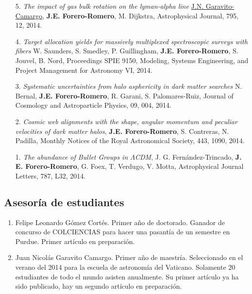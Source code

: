 \documentclass{article}
\begin{document}
\begin{enumerate}
\item[5.]{\it The impact of gas bulk rotation on the lyman-alpha line}
  \underline{J.N. Garavito-Camargo},  {\bf J.E. Forero-Romero}, M. Dijkstra,
  Astrophysical Journal, 795, 12, 2014.

\item[4.]{\it } {\it Target allocation yields for massively
  multiplexed spectroscopic surveys with fibers} W. Saunders,
  S. Smedley, P. Guillingham, {\bf J.E. Forero-Romero}, S. Jouvel,
  B. Nord, Proceedings SPIE 9150, Modeling, Systems Engineering, and
  Project Management for Astronomy VI, 2014.

\item[3.]{\it Systematic uncertainties from halo asphericity in dark
  matter searches}  N. Bernal, {\bf J.E. Forero-Romero}, R. Garani,
  S. Palomares-Ruiz, Journal of Cosmology and Astroparticle Physics,
  09, 004, 2014. 

\item[2.]{\it Cosmic web alignments with the shape, angular momentum
  and peculiar velocities of dark matter halos}, 
  {\bf J.E. Forero-Romero}, S. Contreras, N. Padilla, Monthly Notices
  of the Royal Astronomical Society, 443,
  1090, 2014. 

\item[1.]{\it The abundance of Bullet Groups in $\Lambda$CDM},
  J. G. Fern\'andez-Trincado, {\bf J. E. Forero-Romero}, G. Foex,
  T. Verdugo, V. Motta, Astrophysical Journal Letters, 787, L32, 2014.
\end{enumerate}

\subsection{Asesor\'ia de estudiantes}

\begin{enumerate}
\item{Felipe Leonardo G\'omez Cort\'es. Primer a\~no de doctorado. Ganador
  de concurso de COLCIENCIAS para hacer una pasant\'ia de un semestre en
  Purdue. Primer art\'iculo en preparaci\'on.} 

\item{Juan Nicol\'as Garavito Camargo. Primer a\~no de
  maestr\'ia. Seleccionado en el verano del 2014 para la escuela de
  astronom\'ia del Vaticano. Solamente 20 estudiantes de todo el mundo
asisten anualmente. Su primer art\'iculo ya ha sido publicado, hay un segundo
art\'iculo en preparaci\'on.}
\end{enumerate}
\end{document}
